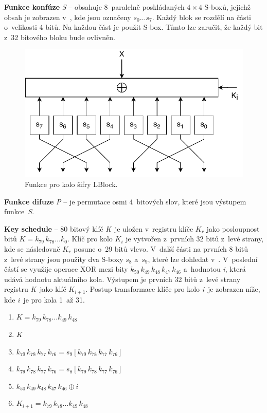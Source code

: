 \noindent \textbf{Funkce konfúze} \textit{S} -- obsahuje 8~paralelně poskládaných $4 \times 4$ S-boxů, jejichž obsah je zobrazen v~, kde jsou označeny $s_0\dots s_7$. Každý blok se rozdělí na části o~velikosti 4 bitů. Na každou část je použit S-box. Tímto lze zaručit, že každý bit z~32 bitového bloku bude ovlivněn.\cite{LBlock}
\begin{figure}[!h]
  \begin{center}
    \includegraphics[scale=0.8]{obrazky/RoundLBLOCK.pdf}
  \end{center}
  \caption[Funkce pro kolo šifry LBlock]{Funkce pro kolo šifry LBlock.\cite{LBlock}}
  \label{img:roundLblock}
\end{figure}

\noindent \textbf{Funkce difuze} \textit{P} -- je permutace osmi 4~bitových slov, které jsou výstupem funkce~\textit{S}.

\noindent \textbf{Key schedule} -- 80 bitový klíč \textit{K}~je uložen v~registru klíče $K_r$ jako posloupnost bitů $K = k_{79}\,k_{78}\dots k_{0}$. Klíč pro kolo $K_i$ je vytvořen z~prvních 32 bitů z~levé strany, kde se následovně $K_r$ posune o~29 bitů vlevo. V~další části na prvních 8 bitů z~levé strany jsou použity dva S-boxy $s_8$ a~$s_9$, které lze dohledat v~. V~poslední částí se využije operace XOR mezi bity $k_{50}\,k_{49}\,k_{48}\,k_{47}\,k_{46}$ a~hodnotou \textit{i}, která udává hodnotu aktuálního kola. Výstupem je prvních 32 bitů z~levé strany registru \textit{K}~jako klíč $K_{i+1}$. Postup transformace klíče pro kolo \textit{i}~je zobrazen níže, kde \textit{i}~je pro kola 1~až 31.\cite{LBlock}
\begin{enumerate}[label=(\Alph*)]
    \item $K = k_{79}\,k_{78}\dots k_{49}\,k_{48}$
    \item \textit{K} 
    \item $k_{79}\,k_{78}\,k_{77}\,k_{76} = s_9 [k_{79}\,k_{78}\,k_{77}\,k_{76}]$
    \item $k_{79}\,k_{78}\,k_{77}\,k_{76} = s_8 [k_{79}\,k_{78}\,k_{77}\,k_{76}]$
    \item $k_{50}\,k_{49}\,k_{48}\,k_{47}\,k_{46} \oplus i$ 
    \item $K_{i+1} = k_{79}\,k_{78}\dots k_{49}\,k_{48}$
\end{enumerate}

